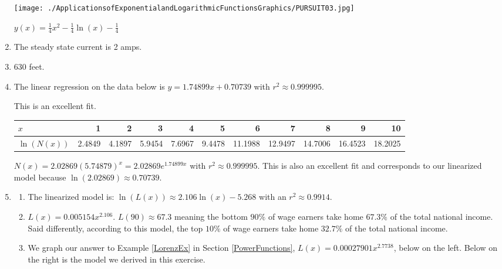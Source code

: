 \documentclass{ximera}
\begin{document}
\begin{enumerate}
\begin{center}

\texttt{[image: ./ApplicationsofExponentialandLogarithmicFunctionsGraphics/PURSUIT03.jpg]}

\smallskip

$y(x) = \frac{1}{4} x^2-\frac{1}{4} \ln(x)-\frac{1}{4}$

\end{center}

\item The steady state current is 2 amps.

\addtocounter{enumi}{1}

\item  630 feet.

\item The linear regression on the data below is $y = 1.74899x + 0.70739$ with $r^{2} \approx 0.999995$.  

This is an excellent fit.

\scriptsize

\noindent \begin{tabular}{|l|r|r|r|r|r|r|r|r|r|r|} \hline
$x$ & 1 & 2 & 3 & 4 & 5 & 6 & 7 & 8 & 9 & 10 \\ 
\hline 
$\ln(N(x))$ & 2.4849 & 4.1897 & 5.9454 & 7.6967 & 9.4478 & 11.1988 & 12.9497 & 14.7006 & 16.4523 & 18.2025 \\ \hline
\end{tabular}

\normalsize

$N(x) = 2.02869(5.74879)^{x} = 2.02869e^{1.74899x}$ with $r^{2} \approx 0.999995$.  This is also an excellent fit and corresponds to our linearized model because $\ln(2.02869) \approx 0.70739$.

\item  \begin{enumerate}
\addtocounter{enumii}{1}

\item  The linearized model is: $\ln(L(x)) \approx 2.106 \ln(x) - 5.268$ with an $r^2 \approx  0.9914$.

\item  $L(x) = 0.005154 x^{2.106}$.  $L(90) \approx 67.3$ meaning the bottom $90 \%$ of wage earners take home $67.3 \%$ of the total national income.  Said differently, according to this model, the top $10 \%$ of wage earners take home $32.7 \%$ of the total national income. 



\item  We graph our answer to Example \ref{LorenzEx} in Section \ref{PowerFunctions}, $L(x) = 0.00027901x^{2.7738}$, below on the left.  Below on the right is the model we derived in this exercise. 


\end{enumerate}
\end{enumerate}
\end{document}
